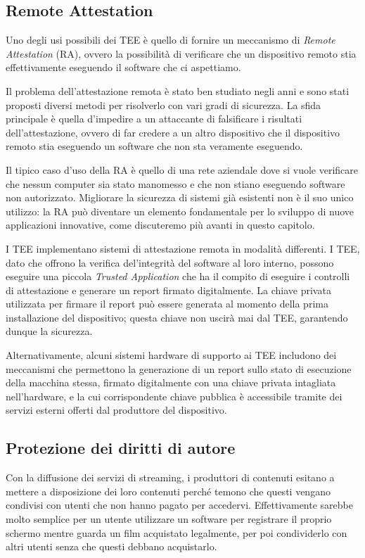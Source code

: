 \documentclass[12pt,italian]{report}
\begin{document}

\subsection{Remote Attestation}
\label{subsec:remote-attestation}
Uno degli usi possibili dei TEE è quello di fornire un meccanismo di
\textit{Remote Attestation} (RA), ovvero la possibilità di verificare che
un dispositivo remoto stia effettivamente eseguendo il software che
ci aspettiamo.

Il problema dell'attestazione remota è stato ben studiato negli anni e
sono stati proposti diversi metodi per risolverlo con vari gradi di
sicurezza.
La sfida principale è quella d'impedire a un attaccante di falsificare
i risultati dell'attestazione, ovvero di far credere a un altro dispositivo
che il dispositivo remoto stia eseguendo un software che non sta veramente
eseguendo.

Il tipico caso d'uso della RA è quello di una rete aziendale dove si
vuole verificare che nessun computer sia stato manomesso
e che non stiano eseguendo software non autorizzato.
Migliorare la sicurezza di sistemi già esistenti non è il suo unico utilizzo:
la RA può diventare un elemento fondamentale per lo sviluppo di nuove
applicazioni innovative, come discuteremo più avanti in questo capitolo.

I TEE implementano sistemi di attestazione remota in modalità
differenti. I TEE, dato che offrono la verifica del'integrità
del software al loro interno, possono eseguire una
piccola \textit{Trusted Application} che ha il compito di eseguire
i controlli di attestazione e generare un report firmato digitalmente.
La chiave privata utilizzata per firmare il report può essere generata al
momento della prima installazione del dispositivo; questa chiave non uscirà
mai dal TEE, garantendo dunque la sicurezza.

Alternativamente, alcuni sistemi hardware di supporto ai TEE includono
dei meccanismi che permettono la generazione di un report sullo stato
di esecuzione della macchina stessa, firmato digitalmente con una
chiave privata intagliata nell'hardware, e la cui corrispondente chiave
pubblica è accessibile tramite dei servizi esterni offerti dal produttore
del dispositivo.

\subsection{Protezione dei diritti di autore}
\label{subsec:drm}
Con la diffusione dei servizi di streaming, i produttori di contenuti esitano
a mettere a disposizione dei loro contenuti perché temono che questi vengano
condivisi con utenti che non hanno pagato per accedervi.
Effettivamente sarebbe molto semplice per un utente utilizzare un software per
registrare il proprio schermo mentre guarda un film acquistato legalmente, per
poi condividerlo con altri utenti senza che questi debbano acquistarlo.
\end{document}
